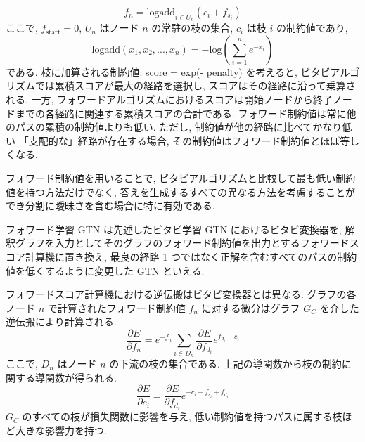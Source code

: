 \documentclass[twocolumn]{jarticle}     %
\begin{document}
\begin{equation}
  f_n = \mathrm{logadd}_{i \in U_n}(c_i + f_{s_i})
\end{equation}
ここで, $f_{\mathrm{start}} = 0$, $U_n$ はノード $n$ の常駐の枝の集合, $c_i$ は枝 $i$ の制約値であり,
\begin{equation}
  \mathrm{logadd}(x_1, x_2,...,x_n) = -\mathrm{log}(\sum_{i=1}^{n}e^{-x_i})
\end{equation}
である.
枝に加算される制約値: score = exp(- penalty) を考えると, ビタビアルゴリズムでは累積スコアが最大の経路を選択し, スコアはその経路に沿って乗算される. 一方, フォワードアルゴリズムにおけるスコアは開始ノードから終了ノードまでの各経路に関連する累積スコアの合計である. フォワード制約値は常に他のパスの累積の制約値よりも低い. ただし, 制約値が他の経路に比べてかなり低い 「支配的な」経路が存在する場合, その制約値はフォワード制約値とほぼ等しくなる. 
\par
フォワード制約値を用いることで, ビタビアルゴリズムと比較して最も低い制約値を持つ方法だけでなく, 答えを生成するすべての異なる方法を考慮することができ分割に曖昧さを含む場合に特に有効である. 
\par
フォワード学習 GTN は先述したビタビ学習 GTN におけるビタビ変換器を, 解釈グラフを入力としてそのグラフのフォワード制約値を出力とするフォワードスコア計算機に置き換え, 最良の経路 1 つではなく正解を含むすべてのパスの制約値を低くするように変更した GTN といえる.
\par
フォワードスコア計算機における逆伝搬はビタビ変換器とは異なる. グラフの各ノード $n$ で計算されたフォワード制約値 $f_n$ に対する微分はグラフ $G_C$ を介した逆伝搬により計算される.
\begin{equation}
  \frac{\partial E}{\partial f_n} = e^{-f_n} \sum_{i \in D_n}\frac{\partial E}{\partial f_{d_i}} e^{f_{d_i} - c_i}
\end{equation}
ここで, $D_n$ はノード $n$ の下流の枝の集合である. 上記の導関数から枝の制約に関する導関数が得られる. 
\begin{equation}
  \frac{\partial E}{\partial c_i} = \frac{\partial E}{\partial f_{d_i}} e^{- c_i - f_{s_i} + f_{d_i} }
\end{equation}
$G_C$ のすべての枝が損失関数に影響を与え, 低い制約値を持つパスに属する枝ほど大きな影響力を持つ. 
\end{document}
